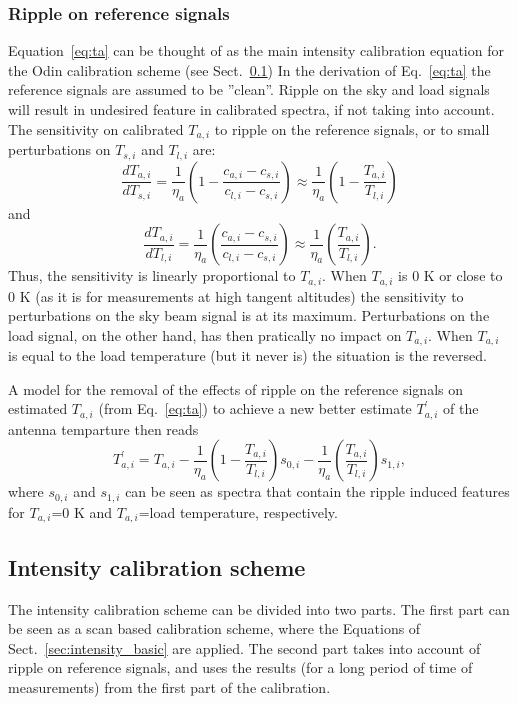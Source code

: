 \documentclass[12pt]{article}
\begin{document}
\subsubsection{Ripple on reference signals}
\label{sec:ripple}
Equation~\ref{eq:ta} can be thought of as the main intensity
calibration equation for the Odin  calibration scheme
(see Sect.~\ref{intensity scheme})
In the derivation of Eq.~\ref{eq:ta} 
the reference signals are assumed to be ''clean''.
Ripple on the sky and load signals will
result in undesired feature in calibrated
spectra, if not taking into account.
The sensitivity on calibrated \(T_{a,i}\) to ripple on the reference signals,
or to small perturbations on \(T_{s,i}\) and \(T_{l,i}\) are:
\begin{equation} 
\frac{dT_{a,i}}{dT_{s,i}}=\frac{1}{\eta_{a}}\left(1-\frac{c_{a,i}-c_{s,i}}{c_{l,i}-c_{s,i}}\right)\approx \frac{1}{\eta_{a}}\left(1-\frac{T_{a,i}}{T_{l,i}}\right)
\end{equation}
and
\begin{equation}
\frac{dT_{a,i}}{dT_{l,i}}=\frac{1}{\eta_{a}}\left(\frac{c_{a,i}-c_{s,i}}{c_{l,i}-c_{s,i}}\right)\approx \frac{1}{\eta_{a}}\left(\frac{T_{a,i}}{T_{l,i}}\right).
\end{equation}
Thus, the sensitivity is linearly proportional to \(T_{a,i}\).
When \(T_{a,i}\) is 0 K or close to 0 K (as it is for measurements at high
tangent altitudes) the sensitivity to perturbations on
the sky beam signal is at its maximum.
Perturbations on the load signal, on the other hand, has then pratically
no impact on \(T_{a,i}\).
When \(T_{a,i}\) is equal to the load temperature (but it never is)
the situation is the reversed.

A model for the removal of the effects of ripple on the reference signals
on estimated \(T_{a,i}\) (from Eq.~\ref{eq:ta}) to achieve a new 
better estimate \(T^{'}_{a,i}\) of the antenna temparture then reads
\begin{equation}
\label{correction}
T^{'}_{a,i}=T_{a,i}-\frac{1}{\eta_{a}}\left(1-\frac{T_{a,i}}{T_{l,i}}\right) s_{0,i}-
 \frac{1}{\eta_{a}}\left(\frac{T_{a,i}}{T_{l,i}}\right) s_{1,i},
\end{equation}
where \(s_{0,i}\) and \(s_{1,i}\) can be seen as spectra that contain
the ripple induced features for \(T_{a,i}\)=0 K and \(T_{a,i}\)=load temperature,
respectively.



\subsection{Intensity calibration scheme}
\label{intensity scheme}
The intensity calibration scheme can be divided into two parts.
The first part can be seen as a scan based calibration
scheme, where the Equations of Sect.~\ref{sec:intensity_basic}
are applied.
The second part takes into account of ripple on reference signals,
and uses the results (for a long period of time of measurements)
from the first part of the calibration.
\end{document}
